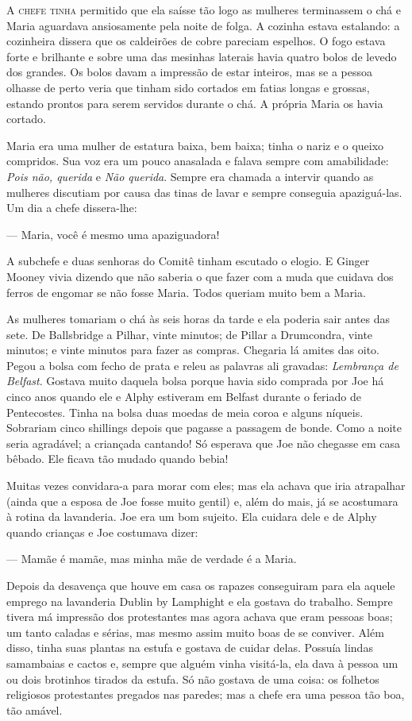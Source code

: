 \textsc{A chefe tinha} permitido que ela saísse tão logo as mulheres terminassem
o chá e Maria aguardava ansiosamente pela noite de folga. A cozinha
estava estalando: a cozinheira dissera que os caldeirões de cobre
pareciam espelhos. O fogo estava forte e brilhante e sobre uma das
mesinhas laterais havia quatro bolos de levedo dos grandes. Os bolos
davam a impressão de estar inteiros, mas se a pessoa olhasse de perto
veria que tinham sido cortados em fatias longas e grossas, estando
prontos para serem servidos durante o chá. A própria Maria os havia
cortado.

Maria era uma mulher de estatura baixa, bem baixa; tinha o nariz e o
queixo compridos. Sua voz era um pouco anasalada e falava sempre com
amabilidade: \textit{Pois não, querida} e \textit{Não querida}. Sempre era chamada a
intervir quando as mulheres discutiam por causa das tinas de lavar e
sempre conseguia apaziguá-las. Um dia a chefe dissera-lhe:

--- Maria, você é mesmo uma apaziguadora!

A subchefe e duas senhoras do Comitê tinham escutado o elogio. E Ginger
Mooney vivia dizendo que não saberia o que fazer com a muda que
cuidava dos ferros de engomar se não fosse Maria. Todos queriam muito
bem a Maria.

As mulheres tomariam o chá às seis horas da tarde e ela poderia sair
antes das sete. De Ballsbridge a Pilhar, vinte minutos;
de Pillar a Drumcondra, vinte minutos; e vinte minutos para fazer as
compras. Chegaria lá amites das oito. Pegou a bolsa com fecho de prata
e releu as palavras ali gravadas: \textit{Lembrança de Belfast}. Gostava muito
daquela bolsa porque havia sido comprada por Joe há cinco anos quando
ele e Alphy estiveram em Belfast durante o feriado de Pentecostes.
Tinha na bolsa duas moedas de meia coroa e alguns níqueis. Sobrariam
cinco shillings depois que pagasse a passagem de bonde. Como a noite
seria agradável; a criançada cantando! Só esperava que Joe não
chegasse em casa bêbado. Ele ficava tão mudado quando bebia!

Muitas vezes convidara-a para morar com eles; mas ela achava que iria
atrapalhar (ainda que a esposa de Joe fosse muito gentil) e, além do
mais, já se acostumara à rotina da lavanderia. Joe era um bom
sujeito. Ela cuidara dele e de Alphy quando crianças e Joe costumava
dizer:

--- Mamãe é mamãe, mas minha mãe de verdade é a Maria.

Depois da desavença que houve em casa os rapazes conseguiram para
ela aquele emprego na lavanderia Dublin by Lamphight e ela gostava
do trabalho. Sempre tivera má impressão dos protestantes mas agora
achava que eram pessoas boas; um tanto caladas e sérias, mas mesmo
assim muito boas de se conviver. Além disso, tinha suas plantas na
estufa e gostava de cuidar delas. Possuía lindas samambaias e cactos
e, sempre que alguém vinha visitá-la, ela dava à pessoa um ou dois
brotinhos tirados da estufa. Só não gostava de uma coisa: os folhetos
religiosos protestantes pregados nas paredes; mas a chefe era uma
pessoa tão boa, tão amável.

